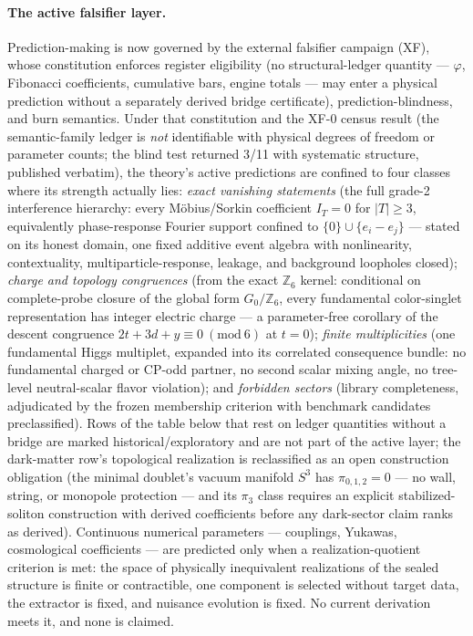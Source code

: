 \documentclass[11pt]{article}
\theoremstyle{plain}
\theoremstyle{definition}
\theoremstyle{remark}
\begin{document}
\paragraph{The active falsifier layer.}
Prediction-making is now governed by the external falsifier campaign (XF), whose constitution enforces register eligibility (no structural-ledger quantity --- \(\varphi\), Fibonacci coefficients, cumulative bars, engine totals --- may enter a physical prediction without a separately derived bridge certificate), prediction-blindness, and burn semantics. Under that constitution and the XF-0 census result (the semantic-family ledger is \emph{not} identifiable with physical degrees of freedom or parameter counts; the blind test returned 3/11 with systematic structure, published verbatim), the theory's active predictions are confined to four classes where its strength actually lies: \emph{exact vanishing statements} (the full grade-2 interference hierarchy: every M\"obius/Sorkin coefficient \(I_T=0\) for \(|T|\ge3\), equivalently phase-response Fourier support confined to \(\{0\}\cup\{e_i-e_j\}\) --- stated on its honest domain, one fixed additive event algebra with nonlinearity, contextuality, multiparticle-response, leakage, and background loopholes closed); \emph{charge and topology congruences} (from the exact \(\mathbb Z_6\) kernel: conditional on complete-probe closure of the global form \(G_0/\mathbb Z_6\), every fundamental color-singlet representation has integer electric charge --- a parameter-free corollary of the descent congruence \(2t+3d+y\equiv0\ (\mathrm{mod}\ 6)\) at \(t=0\)); \emph{finite multiplicities} (one fundamental Higgs multiplet, expanded into its correlated consequence bundle: no fundamental charged or CP-odd partner, no second scalar mixing angle, no tree-level neutral-scalar flavor violation); and \emph{forbidden sectors} (library completeness, adjudicated by the frozen membership criterion with benchmark candidates preclassified). Rows of the table below that rest on ledger quantities without a bridge are marked historical/exploratory and are not part of the active layer; the dark-matter row's topological realization is reclassified as an open construction obligation (the minimal doublet's vacuum manifold \(S^3\) has \(\pi_{0,1,2}=0\) --- no wall, string, or monopole protection --- and its \(\pi_3\) class requires an explicit stabilized-soliton construction with derived coefficients before any dark-sector claim ranks as derived). Continuous numerical parameters --- couplings, Yukawas, cosmological coefficients --- are predicted only when a realization-quotient criterion is met: the space of physically inequivalent realizations of the sealed structure is finite or contractible, one component is selected without target data, the extractor is fixed, and nuisance evolution is fixed. No current derivation meets it, and none is claimed.
\end{document}
